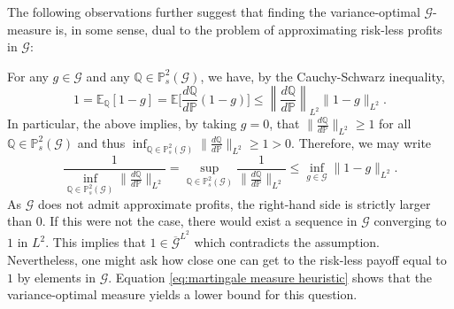 \documentclass[11pt,a4paper,twoside,openany]{report}
\numberwithin{equation}{section}
\theoremstyle{plain} %
\theoremstyle{definition} %
\theoremstyle{remark} %
\begin{document}
The following observations further suggest that finding the variance-optimal \(\mathcal{G}\)-measure is, in some sense, dual to the problem of approximating risk-less profits in \(\mathcal{G}\):



For any $g\in\mathcal{G}$ and any $\mathbb{Q}\in\mathbb{P}^2_s(\mathcal{G})$, we have, by the Cauchy-Schwarz inequality,
\begin{equation*}
1 = \mathbb{E}_\mathbb{Q}[1-g]
= \mathbb{E}\bigg[\frac{d\mathbb{Q}}{d\mathbb{P}}(1-g)\bigg]
\leq \left\lVert\frac{d\mathbb{Q}}{d\mathbb{P}}\right\rVert_{L^2}\lVert1-g\rVert_{L^2}.
\end{equation*}
In particular, the above implies, by taking \(g=0\), that \(\Big\lVert\frac{d\mathbb{Q}}{d\mathbb{P}}\Big\rVert_{L^2}\geq 1\) for all \(\mathbb{Q}\in\mathbb{P}^2_s(\mathcal{G})\) and thus \(\inf_{\mathbb{Q}\in\mathbb{P}^2_s(\mathcal{G})}\Big\lVert\frac{d\mathbb{Q}}{d\mathbb{P}}\Big\rVert_{L^2}\geq 1>0\). Therefore, we may write
\begin{equation}\label{eq:martingale measure heuristic}
\frac{1}{\inf\limits_{\mathbb{Q}\in\mathbb{P}^2_s(\mathcal{G})}\Big\lVert\frac{d\mathbb{Q}}{d\mathbb{P}}\Big\rVert_{L^2}}
=
\sup\limits_{\mathbb{Q}\in\mathbb{P}^2_s(\mathcal{G})}\frac{1}{\Big\lVert\frac{d\mathbb{Q}}{d\mathbb{P}}\Big\rVert_{L^2}}
\leq
\inf\limits_{g\in\mathcal{G}}\|1-g\|_{L^2}.
\end{equation}
As \(\mathcal{G}\) does not admit approximate profits, the right-hand side is strictly larger than \(0\). If this were not the case, there would exist a sequence in \(\mathcal{G}\) converging to \(1\) in \(L^2\). This implies that \(1\in\overline{\mathcal{G}}^{L^2}\) which contradicts the assumption. Nevertheless, one might ask how close one can get to the risk-less payoff equal to \(1\) by elements in \(\mathcal{G}\). Equation \eqref{eq:martingale measure heuristic} shows that the variance-optimal measure yields a lower bound for this question. 
\end{document}
